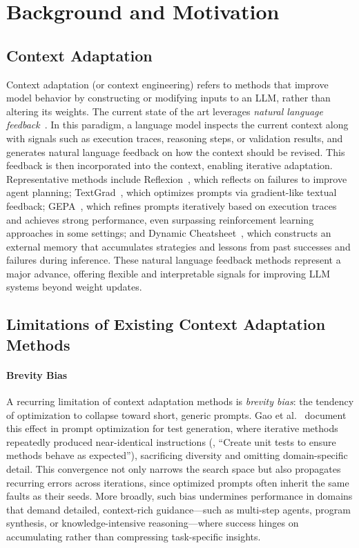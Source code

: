 \section{Background and Motivation}

\subsection{Context Adaptation}

Context adaptation (or context engineering) refers to methods that improve model behavior by constructing or modifying inputs to an LLM, rather than altering its weights.
The current state of the art leverages \textit{natural language feedback}~\citep{shinn2023reflexion, yuksekgonul2024textgrad, agrawal2025gepa}.
In this paradigm, a language model inspects the current context along with signals such as execution traces, reasoning steps, or validation results, and generates natural language feedback on how the context should be revised.
This feedback is then incorporated into the context, enabling iterative adaptation.
Representative methods include Reflexion~\citep{shinn2023reflexion}, which reflects on failures to improve agent planning; TextGrad~\citep{yuksekgonul2024textgrad}, which optimizes prompts via gradient-like textual feedback; 
GEPA~\citep{agrawal2025gepa}, which refines prompts iteratively based on execution traces and achieves strong performance, even surpassing reinforcement learning approaches in some settings;
and Dynamic Cheatsheet~\citep{krause2019dynamic}, which constructs an external memory that accumulates strategies and lessons from past successes and failures during inference.
These natural language feedback methods represent a major advance, offering flexible and interpretable signals for improving LLM systems beyond weight updates.

\subsection{Limitations of Existing Context Adaptation Methods}
\label{subsec:limitations}

\paragraph{Brevity Bias}
A recurring limitation of context adaptation methods is \textit{brevity bias}: the tendency of optimization to collapse toward short, generic prompts.
Gao et al.~\citep{gao2025prompt} document this effect in prompt optimization for test generation, where iterative methods repeatedly produced near-identical instructions (\eg, “Create unit tests to ensure methods behave as expected”), sacrificing diversity and omitting domain-specific detail.
This convergence not only narrows the search space but also propagates recurring errors across iterations, since optimized prompts often inherit the same faults as their seeds.
More broadly, such bias undermines performance in domains that demand detailed, context-rich guidance—such as multi-step agents, program synthesis, or knowledge-intensive reasoning—where success hinges on accumulating rather than compressing task-specific insights.

